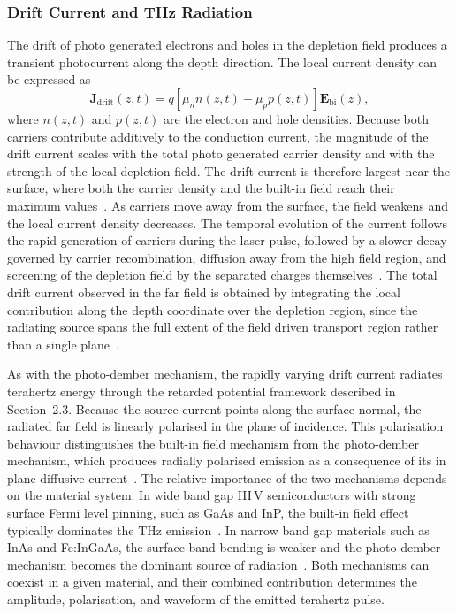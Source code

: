 \documentclass[12pt]{final_project_report}
\begin{document}
\subsubsection{Drift Current and THz Radiation}

The drift of photo generated electrons and holes in the depletion field produces a transient photocurrent along the depth direction. The local current density can be expressed as
\begin{equation}
    \mathbf{J}_{\mathrm{drift}}(z,t) = q\left[\mu_n n(z,t) + \mu_p p(z,t)\right] \mathbf{E}_{\mathrm{bi}}(z),
    \label{eq:drift_current_density}
\end{equation}
where $n(z,t)$ and $p(z,t)$ are the electron and hole densities. Because both carriers contribute additively to the conduction current, the magnitude of the drift current scales with the total photo generated carrier density and with the strength of the local depletion field. The drift current is therefore largest near the surface, where both the carrier density and the built-in field reach their maximum values~\cite{SimulationTHz}. As carriers move away from the surface, the field weakens and the local current density decreases. The temporal evolution of the current follows the rapid generation of carriers during the laser pulse, followed by a slower decay governed by carrier recombination, diffusion away from the high field region, and screening of the depletion field by the separated charges themselves~\cite{Malevich2021}. The total drift current observed in the far field is obtained by integrating the local contribution along the depth coordinate over the depletion region, since the radiating source spans the full extent of the field driven transport region rather than a single plane~\cite{SimulationTHz}.

As with the photo-dember mechanism, the rapidly varying drift current radiates terahertz energy through the retarded potential framework described in Section~2.3. Because the source current points along the surface normal, the radiated far field is linearly polarised in the plane of incidence. This polarisation behaviour distinguishes the built-in field mechanism from the photo-dember mechanism, which produces radially polarised emission as a consequence of its in plane diffusive current~\cite{YangTonouchi2022,SimulationTHz}. The relative importance of the two mechanisms depends on the material system. In wide band gap III\,V semiconductors with strong surface Fermi level pinning, such as GaAs and InP, the built-in field effect typically dominates the THz emission~\cite{auston_picosecond_1984,SimulationTHz}. In narrow band gap materials such as InAs and Fe:InGaAs, the surface band bending is weaker and the photo-dember mechanism becomes the dominant source of radiation~\cite{Reklaitis2010}. Both mechanisms can coexist in a given material, and their combined contribution determines the amplitude, polarisation, and waveform of the emitted terahertz pulse.
\end{document}
